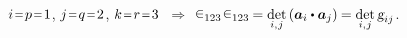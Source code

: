 \begin{otherlanguage}{russian}
\vspace{0.12em}\noindent ${i \narroweq p \narroweq 1}$, ${j \narroweq q \narroweq 2}$, ${k \narroweq r \narroweq 3}$ ${\,\Rightarrow}$ ${\levicivita_{123} \hspace{0.2ex} \levicivita_{123} \hspace{-0.12ex}= \underset{i,\hspace{0.1ex}j}{\operatorname{det}} \left( \bm{a}_i \dotp \bm{a}_j \right) \hspace{-0.1ex}= \underset{i,\hspace{0.1ex}j}{\operatorname{det}} \, \textsl{g}_{ij}}$.

\begin{comment} %
\[\scalebox{0.92}[0.92]{$\begin{array}{l@{\hspace{0.3em}}c@{\hspace{0.36em}}r}
\gamma \hspace{0.1ex} \bm{a}^{\hspace{-0.1ex}1} & = & \hspace{0.1ex} \bm{a}_2 \hspace{-0.1ex} \times \bm{a}_3 \hspace{0.1ex} \\[0.2em]
\gamma \hspace{0.1ex} \bm{a}^2 & = & \hspace{0.1ex} \bm{a}_3 \hspace{-0.1ex} \times \bm{a}_1 \hspace{0.1ex} \\[0.2em]
\gamma \hspace{0.1ex} \bm{a}^3 & = & \hspace{0.1ex} \bm{a}_1 \hspace{-0.16ex} \times \bm{a}_2 \hspace{0.1ex}
\end{array}$}\]
\end{comment} %


\end{otherlanguage}
